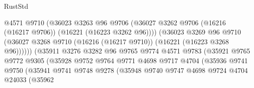 \begin{lexlean}{RustStd}
\begin{coremodule}
                                      @4571
                                      @9710
                                      (@36023
                                        @3263
                                        @96
                                        @9706
                                        (@36027
                                          @3262
                                          @9706
                                          (@16216 (@16217 @9706))
                                          (@16221 (@16223 @3262 @96))))
                                      (@36023
                                        @3269
                                        @96
                                        @9710
                                        (@36027
                                          @3268
                                          @9710
                                          (@16216 (@16217 @9710))
                                          (@16221 (@16223 @3268 @96))))))
                                  (@35911
                                    @3276
                                    @3282
                                    @96
                                    @9765
                                    @9774
                                    @4571
                                    @9783
                                    (@35921
                                      @9765
                                      @9772
                                      @9305
                                      (@35928
                                        @9752
                                        @9764
                                        @9771
                                        @4698
                                        @9717
                                        @4704
                                        (@35936
                                          @9741
                                          @9750
                                          (@35941
                                            @9741
                                            @9748
                                            @9278
                                            (@35948
                                              @9740
                                              @9747
                                              @4698
                                              @9724
                                              @4704
                                              @24033
                                              (@35962

\end{coremodule}
\end{lexlean}
